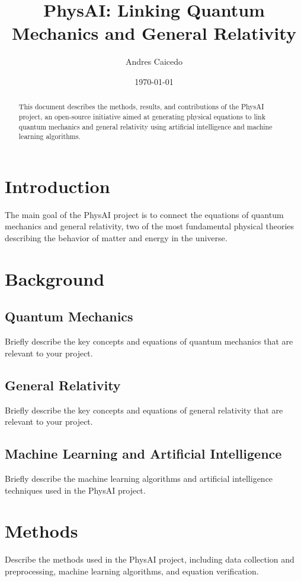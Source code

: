 \documentclass[11pt]{article}
\title{PhysAI: Linking Quantum Mechanics and General Relativity}
\author{Andres Caicedo}
\date{\today}
\begin{document}
\maketitle

\begin{abstract}
    This document describes the methods, results, and contributions of the PhysAI project, an open-source initiative aimed at generating physical equations to link quantum mechanics and general relativity using artificial intelligence and machine learning algorithms. 
\end{abstract}

\section{Introduction}
    The main goal of the PhysAI project is to connect the equations of quantum mechanics and general relativity, two of the most fundamental physical theories describing the behavior of matter and energy in the universe.

\section{Background}
    \subsection{Quantum Mechanics}
        Briefly describe the key concepts and equations of quantum mechanics that are relevant to your project.
        
    \subsection{General Relativity}
        Briefly describe the key concepts and equations of general relativity that are relevant to your project.
        
    \subsection{Machine Learning and Artificial Intelligence}
        Briefly describe the machine learning algorithms and artificial intelligence techniques used in the PhysAI project.

\section{Methods}
    Describe the methods used in the PhysAI project, including data collection and preprocessing, machine learning algorithms, and equation verification.
\end{document}
